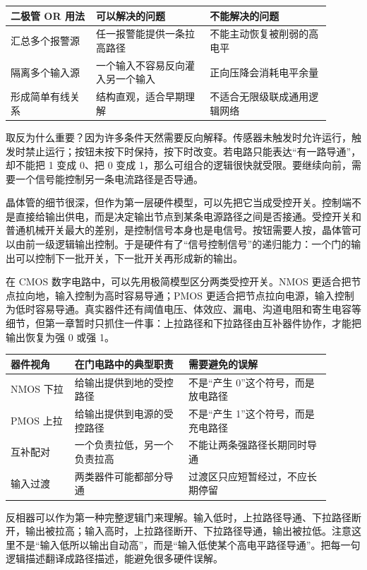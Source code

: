 \begin{longtable}{L{0.24\linewidth}L{0.32\linewidth}L{0.34\linewidth}}
\toprule
二极管 OR 用法 & 可以解决的问题 & 不能解决的问题 \\
\midrule
汇总多个报警源 & 任一报警能提供一条拉高路径 & 不能主动恢复被削弱的高电平 \\
隔离多个输入源 & 一个输入不容易反向灌入另一个输入 & 正向压降会消耗电平余量 \\
形成简单有线关系 & 结构直观，适合早期理解 & 不适合无限级联成通用逻辑网络 \\
\bottomrule
\end{longtable}

取反为什么重要？因为许多条件天然需要反向解释。传感器未触发时允许运行，触发时禁止运行；按钮未按下时保持，按下时改变。若电路只能表达“有一路导通”，却不能把 1 变成 0、把 0 变成 1，那么可组合的逻辑很快就受限。要继续向前，需要一个信号能控制另一条电流路径是否导通。

晶体管的细节很深，但作为第一层硬件模型，可以先把它当成受控开关。控制端不是直接给输出供电，而是决定输出节点到某条电源路径之间是否接通。受控开关和普通机械开关最大的差别，是控制信号本身也是电信号。按钮需要人按，晶体管可以由前一级逻辑输出控制。于是硬件有了“信号控制信号”的递归能力：一个门的输出可以控制下一批开关，下一批开关再形成新的输出。

在 CMOS 数字电路中，可以先用极简模型区分两类受控开关。NMOS 更适合把节点拉向地，输入控制为高时容易导通；PMOS 更适合把节点拉向电源，输入控制为低时容易导通。真实器件还有阈值电压、体效应、漏电、沟道电阻和寄生电容等细节，但第一章暂时只抓住一件事：上拉路径和下拉路径由互补器件协作，才能把输出恢复为强 0 或强 1。

\begin{longtable}{L{0.18\linewidth}L{0.32\linewidth}L{0.4\linewidth}}
\toprule
器件视角 & 在门电路中的典型职责 & 需要避免的误解 \\
\midrule
NMOS 下拉 & 给输出提供到地的受控路径 & 不是“产生 0”这个符号，而是放电路径 \\
PMOS 上拉 & 给输出提供到电源的受控路径 & 不是“产生 1”这个符号，而是充电路径 \\
互补配对 & 一个负责拉低，另一个负责拉高 & 不能让两条强路径长期同时导通 \\
输入过渡 & 两类器件可能都部分导通 & 过渡区只应短暂经过，不应长期停留 \\
\bottomrule
\end{longtable}

反相器可以作为第一种完整逻辑门来理解。输入低时，上拉路径导通、下拉路径断开，输出被拉高；输入高时，上拉路径断开、下拉路径导通，输出被拉低。注意这里不是“输入低所以输出自动高”，而是“输入低使某个高电平路径导通”。把每一句逻辑描述翻译成路径描述，能避免很多硬件误解。

